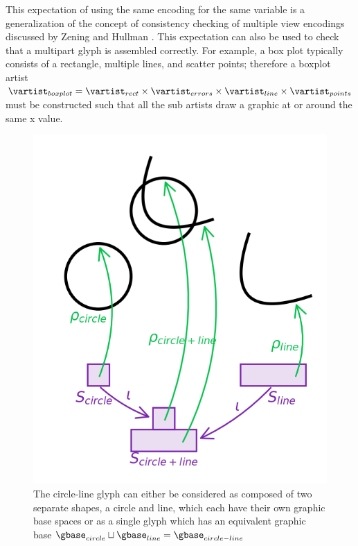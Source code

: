 \documentclass[10pt,journal,compsoc]{IEEEtran}
\theoremstyle{definition}
\theoremstyle{remark}
\begin{document}
This expectation of using the same encoding for the same variable is a generalization of the concept of consistency checking of multiple view encodings discussed by Zening and Hullman \cite{hullmanKeeping2018}. This expectation can also be used to check that a multipart glyph is assembled correctly. For example, a box plot \cite{wickham40YearsBoxplots2011} typically consists of a rectangle, multiple lines, and scatter points; therefore a boxplot artist $\vartist_{boxplot} = \vartist_{rect} \times \vartist_{errors} \times \vartist_{line} \times \vartist_{points}$ must be constructed such that all the sub artists draw a graphic at or around the same x value. 

\begin{figure}[h!]
  \label{fig:artist:operator}
  \includegraphics*[width=1\columnwidth]{qcom.png}
  \caption{The circle-line glyph can either be considered as composed of two separate shapes, a circle and line, which each have their own graphic base spaces or as a single glyph which has an equivalent graphic base  $\gbase_{circle} \sqcup \gbase_{line} = \gbase_{circle-line}$ }
\end{figure}
\end{document}
